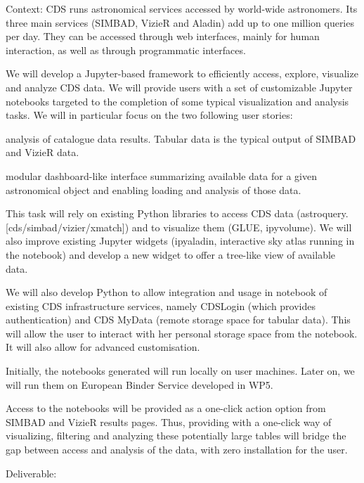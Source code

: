 \begin{task}[
  title=Astro application,
  id=astro,
  lead=CDS,
  PM=18,
  wphases={0-48},
  partners={CDS}
]

  Context: CDS runs astronomical services accessed by world-wide astronomers. Its three main services (SIMBAD, VizieR and Aladin) add up to one million queries per day. They can be accessed through web interfaces, mainly for human interaction, as well as through programmatic interfaces.
    
  We will develop a Jupyter-based framework to efficiently access, explore, visualize and analyze CDS data. 
 We will provide users with a set of customizable Jupyter notebooks targeted to the completion of some typical visualization and analysis tasks. We will in particular focus on the two following user stories:
    \begin{compactitem}
        \item analysis of catalogue data results. Tabular data is the typical output of SIMBAD and VizieR data.
         \item modular dashboard-like interface summarizing available data for a given astronomical object and enabling loading and analysis of those data.
    \end{compactitem}


  This task will rely on existing Python libraries to access CDS data (astroquery.[cds/simbad/vizier/xmatch]) and to visualize them (GLUE, ipyvolume). We will also improve existing Jupyter widgets (ipyaladin, interactive sky atlas running in the notebook) and develop a new widget to offer a tree-like view of available data.
    
  We will also develop Python to allow integration and usage in notebook of existing CDS infrastructure services, namely CDSLogin (which provides authentication) and CDS MyData (remote storage space for tabular data). This will allow the user to interact with her personal storage space from the notebook. It will also allow for advanced customisation.
  
  Initially, the notebooks generated will run locally on user machines. Later on, we will run them on European Binder Service developed in WP5.

  Access to the notebooks will be provided as a one-click action option from SIMBAD and VizieR results pages.
  Thus, providing with a one-click way of visualizing, filtering and analyzing these potentially large tables will bridge the gap between access and analysis of the data, with zero installation for the user.

    Deliverable: 
\end{task}
